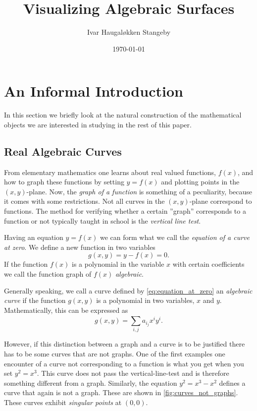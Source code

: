 \documentclass[a4paper]{article}
\title{Visualizing Algebraic Surfaces}
\author{Ivar Haugal{\o}kken Stangeby}
\date{\today}
\theoremstyle{definition}
\begin{document}
    
    \maketitle
    \tableofcontents

    \section{An Informal Introduction}
    \label{sec:an_informal_introduction}
    
    In this section we briefly look at the natural construction of the
    mathematical objects we are interested in studying in the rest of this
    paper.

    \subsection{Real Algebraic Curves}
    \label{sub:real_algebraic_curves}
    
    From elementary mathematics one learns about real valued functions, $f(x)$,
    and how to graph these functions by setting $y = f(x)$ and plotting points
    in the $(x, y)$-plane. Now, the \emph{graph of a function} is something of
    a peculiarity, because it comes with some restrictions. Not all curves in
    the $(x, y)$-plane correspond to functions. The method for verifying
    whether a certain ''graph'' corresponds to a function or not typically
    taught in school is the \emph{vertical line test}. 

    Having an equation $y = f(x)$ we can form what we call the \emph{equation
    of a curve at zero}. We define a new function in two variables
    \begin{equation}
        \label{eq:equation_at_zero}
        g(x, y) = y - f(x) = 0.
    \end{equation}
    If the function $f(x)$ is a polynomial in the variable $x$ with certain
    coefficients we call the function graph of $f(x)$ \emph{algebraic}.

    Generally speaking, we call a curve defined by \cref{eq:equation_at_zero}
    an \emph{algebraic curve} if the function $g(x, y)$ is a polynomial in two
    variables, $x$ and $y$. Mathematically, this can be expressed as
    \begin{equation}
        \label{eq:algebraic_curve}
        g(x, y) = \sum^{}_{i, j} a_{i_j}x^{i}y^{i}.
    \end{equation}
    
    However, if this distinction between a graph and a curve is to be justified
    there has to be some curves that are not graphs. One of the first examples
    one encounter of a curve not corresponding to a function is what you get
    when you set $y^2 = x^3$. This curve does not pass the vertical-line-test
    and is therefore something different from a graph. Similarly, the equation
    $y^2 = x^3 - x^2$ defines a curve that again is not a graph. These are
    shown in \cref{fig:curves_not_graphs}. These curves exhibit \emph{singular
    points} at $(0, 0)$. 
    
\end{document}
